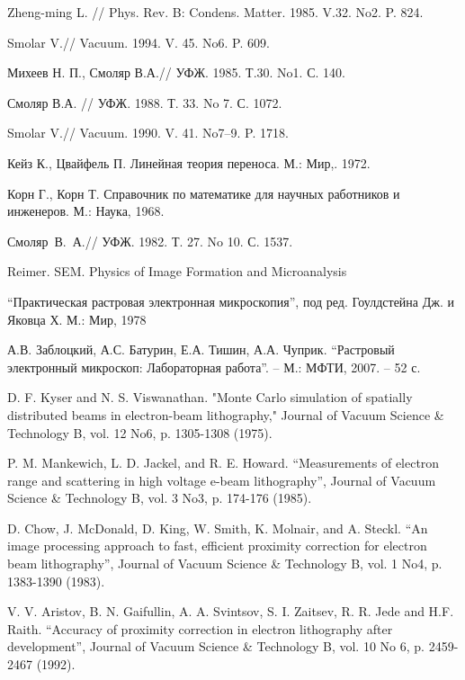 \begin{thebibliography}{99}  
 Zheng-ming L. // Phys. Rev. B: Condens. Matter. 1985. V.32. No2. P. 824.
    
 Smolar V.// Vacuum. 1994. V. 45. No6. P. 609.
   
 Михеев Н. П., Смоляр В.А.// УФЖ. 1985. Т.30. No1. С. 140.
    
 Смоляр В.А. // УФЖ. 1988. Т. 33. No 7. С. 1072.
    
 Smolar V.// Vacuum. 1990. V. 41. No7–9. P. 1718.
    
 Кейз К., Цвайфель П. Линейная теория переноса. М.: Мир,. 1972.
    
 Корн Г., Корн Т. Справочник по математике для научных работников и инженеров. М.: Наука, 1968.
    
 Смоляр~В.~А.// УФЖ. 1982. Т. 27. No 10. С. 1537.
    
 Reimer. SEM. Physics of Image Formation and Microanalysis
    
 ``Практическая растровая электронная микроскопия'', под ред.
Гоулдстейна Дж. и Яковца Х. М.: Мир, 1978
    
 А.В. Заблоцкий, А.С. Батурин, Е.А. Тишин, А.А. Чуприк.
``Растровый электронный микроскоп: Лабораторная работа''. – М.:
МФТИ, 2007. – 52 с.
    
 D. F. Kyser and N. S. Viswanathan. "Monte Carlo simulation of spatially
distributed beams in electron-beam lithography," Journal of Vacuum
Science \& Technology B, vol. 12 No6, p. 1305-1308 (1975).
    
 P. M. Mankewich, L. D. Jackel, and R. E. Howard. ``Measurements of
electron range and scattering in high voltage e-beam lithography'',
Journal of Vacuum Science \& Technology B, vol. 3 No3, p. 174-176
(1985).
    
 D. Chow, J. McDonald, D. King, W. Smith, K. Molnair, and A. Steckl.
``An image processing approach to fast, efficient proximity correction for
electron beam lithography'', Journal of Vacuum Science \& Technology
B, vol. 1 No4, p. 1383-1390 (1983).
    
 V. V. Aristov, B. N. Gaifullin, A. A. Svintsov, S. I. Zaitsev, R. R. Jede
and H.F. Raith. ``Accuracy of proximity correction in electron
lithography after development'', Journal of Vacuum Science \&
Technology B, vol. 10 No 6, p. 2459-2467 (1992).
    

\end{thebibliography}
